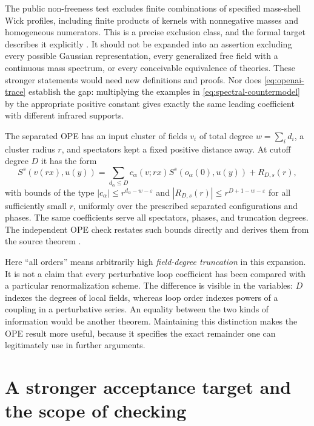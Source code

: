 The public non-freeness test excludes finite combinations of specified
mass-shell Wick profiles, including finite products of kernels with
nonnegative masses and homogeneous numerators.  This is a precise
exclusion class, and the formal target describes it explicitly
\cite{OpenAIChallenge2026}.  It should not be expanded into an assertion
excluding every possible Gaussian representation, every generalized free
field with a continuous mass spectrum, or every conceivable equivalence
of theories.  These stronger statements would need new definitions and
proofs.  Nor does \eqref{eq:openai-trace} establish the gap: multiplying
the examples in \eqref{eq:spectral-countermodel} by the appropriate
positive constant gives exactly the same leading coefficient with
different infrared supports.

The separated OPE has an input cluster of fields $v_i$ of total degree
$w=\sum_i d_i$, a cluster radius $r$, and spectators kept a fixed
positive distance away.  At cutoff degree $D$ it has the form
\begin{equation}
 S^s(v(rx),u(y))=
 \sum_{d_\alpha\leq D}c_\alpha(v;rx)S^s(o_\alpha(0),u(y))
 +R_{D,s}(r),
 \label{eq:openai-ope}
\end{equation}
with bounds of the type
$|c_\alpha|\leq r^{d_\alpha-w-\varepsilon}$ and
$|R_{D,s}(r)|\leq r^{D+1-w-\varepsilon}$ for all sufficiently small
$r$, uniformly over the prescribed separated configurations and phases.
The same coefficients serve all spectators, phases, and truncation
degrees.  The independent OPE check restates such bounds directly and
derives them from the source theorem \cite{YMOPE2026}.

Here ``all orders'' means arbitrarily high \emph{field-degree truncation}
in this expansion.  It is not a claim that every perturbative loop
coefficient has been compared with a particular renormalization scheme.
The difference is visible in the variables: $D$ indexes the degrees of
local fields, whereas loop order indexes powers of a coupling in a
perturbative series.  An equality between the two kinds of information
would be another theorem.  Maintaining this distinction makes the OPE
result more useful, because it specifies the exact remainder one can
legitimately use in further arguments.

\section{A stronger acceptance target and the scope of checking}

